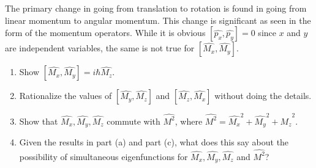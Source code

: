 \item The primary change in going from translation to rotation is found in going from linear momentum
to angular momentum. This change is significant as seen in the form of the momentum operators.
While it is obvious  $[\hat{p_x},\hat{p_y}]=0$ since $x$ and $y$ are independent variables, the same is not true for
$[\hat{M_x},\hat{M_y}]$.
\begin{enumerate}
    \item Show $[\hat{M_x},\hat{M_y}]=i\hbar\hat{M_z}$.
    \item Rationalize the values of $[\hat{M_y},\hat{M_z}]$ and $[\hat{M_z},\hat{M_x}]$ without doing the details.
    \item Show that $\hat{M_x},\hat{M_y},\hat{M_z}$ commute with $\hat{M^2}$, where $\hat{M^2}=\hat{M_x}^2+\hat{M_y}^2+\hat{M_z}^2$.
    \item Given the results in part (a) and part (c), what does this say about the possibility of simultaneous
          eigenfunctions for $\hat{M_x},\hat{M_y},\hat{M_z}$ and $\hat{M^2}$?
\end{enumerate}

